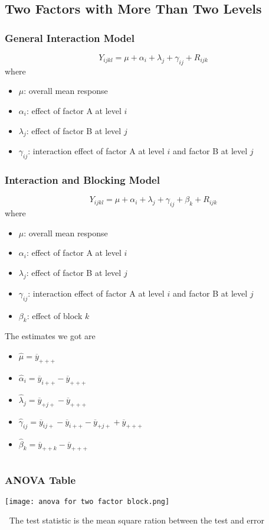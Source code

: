 \documentclass[11pt]{article}
\begin{document}
\subsection{Two Factors with More Than Two Levels}
\subsubsection{General Interaction Model}
\[Y_{ijkl}=\mu+\alpha_i+\lambda_j+\gamma_{ij}+R_{ijk}\]
where
\begin{itemize}
    \item $\mu$: overall mean response
    \item $\alpha_i$: effect of factor A at level $i$
    \item $\lambda_j$: effect of factor B at level $j$
    \item $\gamma_{ij}$: interaction effect of factor A at level $i$ and factor B at level $j$
\end{itemize}
\subsubsection{Interaction and Blocking Model}
\[Y_{ijkl}=\mu+\alpha_i+\lambda_j+\gamma_{ij}+\beta_k+R_{ijk}\]
where 
\begin{itemize}
    \item $\mu$: overall mean response
    \item $\alpha_i$: effect of factor A at level $i$
    \item $\lambda_j$: effect of factor B at level $j$
    \item $\gamma_{ij}$: interaction effect of factor A at level $i$ and factor B at level $j$
    \item $\beta_k$: effect of block $k$
\end{itemize}
The estimates we got are 
\begin{itemize}
    \item $\hat\mu=\overline{y}_{+++}$
    \item $\hat\alpha_i=\overline{y}_{i++}-\overline{y}_{+++}$
    \item $\hat\lambda_j=\overline{y}_{+j+}-\overline{y}_{+++}$
    \item $\hat\gamma_{ij}=\overline{y}_{ij+}-\overline{y}_{i++}-\overline{y}_{+j+}+\overline{y}_{+++}$
    \item $\hat\beta_k=\overline{y}_{++k}-\overline{y}_{+++}$
\end{itemize}
$\ $\newline 
\subsubsection{ANOVA Table}
\begin{figure*}[h!]
    \centering
    \texttt{[image: anova for two factor block.png]}
\end{figure*}
$\ $\newline 
The test statistic is the mean square ration between the test and error 
\end{document}
